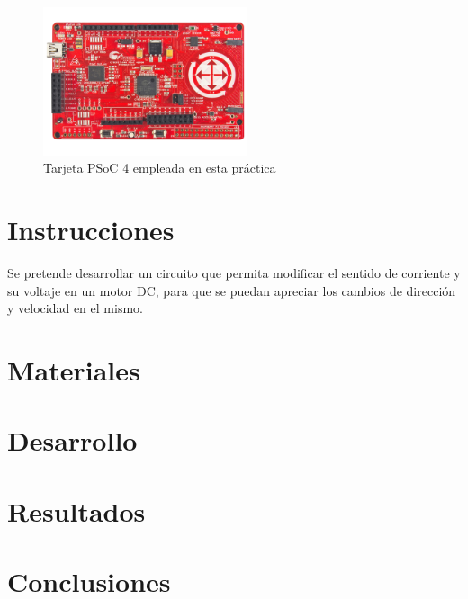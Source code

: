 \documentclass[]{article}
\begin{document}
\clearpage

\begin{figure}[htb]
    \centering
    \includegraphics[width=6cm]{Imagenes/PSOC.png}
    \caption{Tarjeta PSoC 4 empleada en esta práctica}
\end{figure}

\section{Instrucciones}

Se pretende desarrollar un circuito que permita modificar el sentido de corriente y su voltaje en un motor DC, para que se puedan apreciar los cambios de dirección y velocidad 
en el mismo. 

\section{Materiales}



\section{Desarrollo}



\section{Resultados}


\section{Conclusiones}



\end{document}
